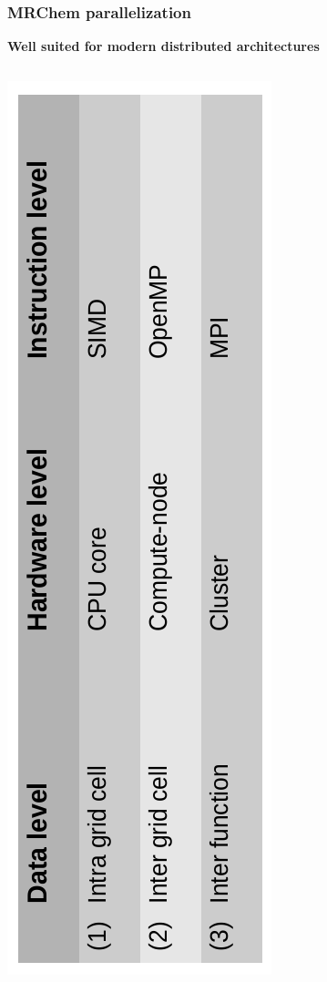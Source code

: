 \begin{frame}
\frametitle{MRChem parallelization}

\centering
\textbf{Well suited for modern distributed architectures}

\begin{columns}
\begin{column}[b]{0.5\linewidth}

\includegraphics[scale=0.4, angle=-90]{figures/parallelization.pdf}


\end{column}
\end{columns}
\end{frame}
